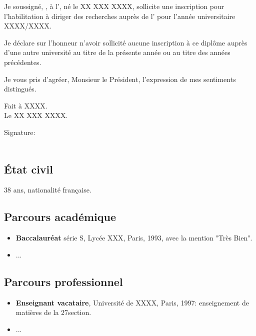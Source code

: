 \documentclass[french]{hdrapplication}
\begin{document}
 

Je soussigné, ,  à l', né le XX XXX XXXX, sollicite une inscription pour l'habilitation à diriger des recherches auprès de l' pour l'année universitaire XXXX/XXXX.


Je déclare sur l'honneur n'avoir sollicité aucune inscription à ce diplôme auprès d'une autre université au titre de la présente année ou au titre des années précédentes.


Je vous pris d'agréer, Monsieur le Président, l'expression de mes sentiments distingués.

\vspace{1cm}
Fait à XXXX. \\
Le XX XXX XXXX.


\vspace{1cm}
\noindent Signature: \\
\vspace{.25cm}
\textbf{\large{}} \\[.5cm]
\newpage




\subsection{\'Etat civil}

38 ans, nationalité française.

\subsection{Parcours académique}

\begin{itemize}
\item \textbf{Baccalauréat} série S, Lycée XXX, Paris, 1993, avec la mention "Très Bien".
\item ...
\end{itemize}

\subsection{Parcours professionnel}

\begin{itemize}
\item \textbf{Enseignant vacataire}, Université de XXXX, Paris, 1997: enseignement de matières de la 27\eme section.
\item ...
\end{itemize}
\end{document}
